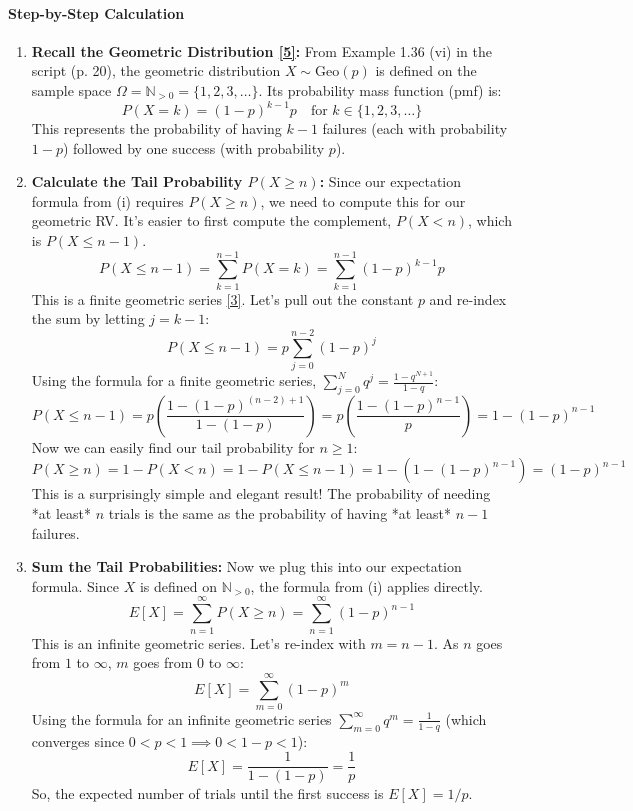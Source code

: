 \documentclass[11pt,a4paper]{article}
\begin{document}
\paragraph{Step-by-Step Calculation}
\begin{enumerate}
    \item \textbf{Recall the Geometric Distribution \hyperlink{note_geo_exp}{[5]}:}
    From Example 1.36 (vi) in the script (p. 20), the geometric distribution $X \sim \text{Geo}(p)$ is defined on the sample space $\Omega = \mathbb{N}_{>0} = \{1, 2, 3, \dots\}$. Its probability mass function (pmf) is:
    \[
        P(X=k) = (1-p)^{k-1}p \quad \text{for } k \in \{1, 2, 3, \dots\}
    \]
    This represents the probability of having $k-1$ failures (each with probability $1-p$) followed by one success (with probability $p$).

    \item \textbf{Calculate the Tail Probability $P(X \ge n)$:}
    Since our expectation formula from (i) requires $P(X \ge n)$, we need to compute this for our geometric RV. It's easier to first compute the complement, $P(X < n)$, which is $P(X \le n-1)$.
    \[
        P(X \le n-1) = \sum_{k=1}^{n-1} P(X=k) = \sum_{k=1}^{n-1} (1-p)^{k-1}p
    \]
    This is a finite geometric series \hyperlink{note_geo_series}{[3]}. Let's pull out the constant $p$ and re-index the sum by letting $j = k-1$:
    \[
        P(X \le n-1) = p \sum_{j=0}^{n-2} (1-p)^j
    \]
    Using the formula for a finite geometric series, $\sum_{j=0}^{N} q^j = \frac{1-q^{N+1}}{1-q}$:
    \[
        P(X \le n-1) = p \left( \frac{1 - (1-p)^{(n-2)+1}}{1 - (1-p)} \right) = p \left( \frac{1 - (1-p)^{n-1}}{p} \right) = 1 - (1-p)^{n-1}
    \]
    Now we can easily find our tail probability for $n \ge 1$:
    \[
        P(X \ge n) = 1 - P(X < n) = 1 - P(X \le n-1) = 1 - (1 - (1-p)^{n-1}) = (1-p)^{n-1}
    \]
    This is a surprisingly simple and elegant result! The probability of needing *at least* $n$ trials is the same as the probability of having *at least* $n-1$ failures.

    \item \textbf{Sum the Tail Probabilities:}
    Now we plug this into our expectation formula. Since $X$ is defined on $\mathbb{N}_{>0}$, the formula from (i) applies directly.
    \[
        E[X] = \sum_{n=1}^{\infty} P(X \ge n) = \sum_{n=1}^{\infty} (1-p)^{n-1}
    \]
    This is an infinite geometric series. Let's re-index with $m = n-1$. As $n$ goes from $1$ to $\infty$, $m$ goes from $0$ to $\infty$:
    \[
        E[X] = \sum_{m=0}^{\infty} (1-p)^m
    \]
    Using the formula for an infinite geometric series $\sum_{m=0}^{\infty} q^m = \frac{1}{1-q}$ (which converges since $0 < p < 1 \implies 0 < 1-p < 1$):
    \[
        E[X] = \frac{1}{1 - (1-p)} = \frac{1}{p}
    \]
    So, the expected number of trials until the first success is $\boxed{E[X] = 1/p}$.
\end{enumerate}
\end{document}
